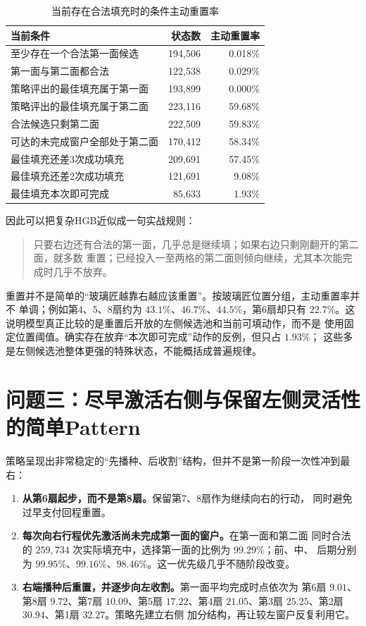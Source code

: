 \documentclass[UTF8,11pt,openany]{ctexrep}
\begin{document}
\begin{table}[htbp]
\centering
\caption{当前存在合法填充时的条件主动重置率}
\label{tab:reset-pattern}
\begin{tabular}{lrr}
\toprule
当前条件 & 状态数 & 主动重置率 \\
\midrule
至少存在一个合法第一面候选 & 194,506 & 0.018\% \\
第一面与第二面都合法 & 122,538 & 0.029\% \\
策略评出的最佳填充属于第一面 & 193,899 & 0.000\% \\
策略评出的最佳填充属于第二面 & 223,116 & 59.68\% \\
合法候选只剩第二面 & 222,509 & 59.83\% \\
可达的未完成窗户全部处于第二面 & 170,412 & 58.34\% \\
最佳填充还差3次成功填充 & 209,691 & 57.45\% \\
最佳填充还差2次成功填充 & 121,691 & 9.08\% \\
最佳填充本次即可完成 & 85,633 & 1.93\% \\
\bottomrule
\end{tabular}
\end{table}

因此可以把复杂HGB近似成一句实战规则：
\begin{quote}
只要右边还有合法的第一面，几乎总是继续填；如果右边只剩刚翻开的第二面，就多数
重置；已经投入一至两格的第二面则倾向继续，尤其本次能完成时几乎不放弃。
\end{quote}

重置并不是简单的“玻璃匠越靠右越应该重置”。按玻璃匠位置分组，主动重置率并不
单调；例如第4、5、8扇约为 $43.1\%$、$46.7\%$、$44.5\%$，第6扇却只有
$22.7\%$。这说明模型真正比较的是重置后开放的左侧候选池和当前可填动作，而不是
使用固定位置阈值。确实存在放弃“本次即可完成”动作的反例，但只占 $1.93\%$；
这些多是左侧候选池整体更强的特殊状态，不能概括成普遍规律。

\section{问题三：尽早激活右侧与保留左侧灵活性的简单Pattern}

策略呈现出非常稳定的“先播种、后收割”结构，但并不是第一阶段一次性冲到最右：

\begin{enumerate}[leftmargin=*]
    \item \textbf{从第6扇起步，而不是第8扇。}保留第7、8扇作为继续向右的行动，
    同时避免过早支付回程重置。
    \item \textbf{每次向右行程优先激活尚未完成第一面的窗户。}在第一面和第二面
    同时合法的 $259{,}734$ 次实际填充中，选择第一面的比例为 $99.29\%$；前、中、
    后期分别为 $99.95\%$、$99.16\%$、$98.46\%$。这一优先级几乎不随阶段改变。
    \item \textbf{右端播种后重置，并逐步向左收割。}第一面平均完成时点依次为
    第6扇 $9.01$、第8扇 $9.72$、第7扇 $10.09$、第5扇 $17.22$、第4扇
    $21.05$、第3扇 $25.25$、第2扇 $30.94$、第1扇 $32.27$。策略先建立右侧
    加分结构，再让较左窗户反复利用它。
\end{enumerate}
\end{document}
